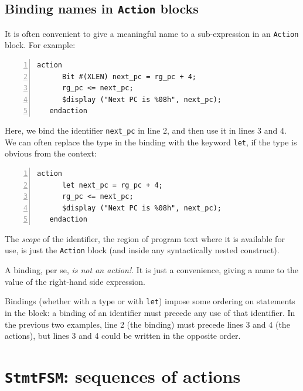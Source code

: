 
\subsection{Binding names in {\tt Action} blocks}


It is often convenient to give a meaningful name to a sub-expression
in an {\tt Action} block.  For example:

{\small
\begin{Verbatim}[frame=single, numbers=left]
   action
      Bit #(XLEN) next_pc = rg_pc + 4;
      rg_pc <= next_pc;
      $display ("Next PC is %08h", next_pc);
   endaction
\end{Verbatim}
}

Here, we bind the identifier \verb|next_pc| in line 2, and then use it
in lines 3 and 4.  We can often replace the type in the binding with
the keyword {\tt let}, if the type is obvious from the context:

{\small
\begin{Verbatim}[frame=single, numbers=left]
   action
      let next_pc = rg_pc + 4;
      rg_pc <= next_pc;
      $display ("Next PC is %08h", next_pc);
   endaction
\end{Verbatim}
}

The \emph{scope} of the identifier, {\ie} the region of program text
where it is available for use, is just the {\tt Action} block (and
inside any syntactically nested construct).

A binding, per se, \emph{is not an action!}.  It is just a
convenience, giving a name to the value of the right-hand side
expression.

Bindings (whether with a type or with \verb|let|) impose some ordering
on statements in the block: a binding of an identifier must precede
any use of that identifier.  In the previous two examples, line 2 (the
binding) must precede lines 3 and 4 (the actions), but lines 3 and 4
could be written in the opposite order.


\section{{\tt StmtFSM}: sequences of actions}


